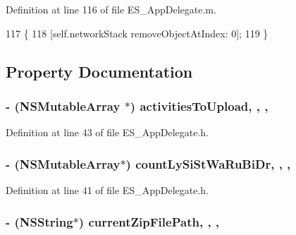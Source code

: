 Definition at line 116 of file E\+S\+\_\+\+App\+Delegate.\+m.


\begin{DoxyCode}
117 \{
118     [\textcolor{keyword}{self}.networkStack removeObjectAtIndex: 0];
119 \}
\end{DoxyCode}


\subsection{Property Documentation}
\hypertarget{interface_e_s___app_delegate_a29cc59d395fcf039b4d0edcd861f9ce2}{
\subsubsection[{activities\+To\+Upload}]{\setlength{\rightskip}{0pt plus 5cm}-\/ (N\+S\+Mutable\+Array $\ast$) activities\+To\+Upload\hspace{0.3cm}{\ttfamily [read]}, {\ttfamily [write]}, {\ttfamily [nonatomic]}, {\ttfamily [strong]}}}\label{interface_e_s___app_delegate_a29cc59d395fcf039b4d0edcd861f9ce2}


Definition at line 43 of file E\+S\+\_\+\+App\+Delegate.\+h.

\hypertarget{interface_e_s___app_delegate_a2429ae456b3143bf705f3de121a9b303}{
\subsubsection[{count\+Ly\+Si\+St\+Wa\+Ru\+Bi\+Dr}]{\setlength{\rightskip}{0pt plus 5cm}-\/ (N\+S\+Mutable\+Array$\ast$) count\+Ly\+Si\+St\+Wa\+Ru\+Bi\+Dr\hspace{0.3cm}{\ttfamily [read]}, {\ttfamily [write]}, {\ttfamily [nonatomic]}, {\ttfamily [strong]}}}\label{interface_e_s___app_delegate_a2429ae456b3143bf705f3de121a9b303}


Definition at line 41 of file E\+S\+\_\+\+App\+Delegate.\+h.

\hypertarget{interface_e_s___app_delegate_a7bd93a2eb34489487b480ed5a944cea0}{
\subsubsection[{current\+Zip\+File\+Path}]{\setlength{\rightskip}{0pt plus 5cm}-\/ (N\+S\+String$\ast$) current\+Zip\+File\+Path\hspace{0.3cm}{\ttfamily [read]}, {\ttfamily [write]}, {\ttfamily [nonatomic]}, {\ttfamily [strong]}}}\label{interface_e_s___app_delegate_a7bd93a2eb34489487b480ed5a944cea0}


